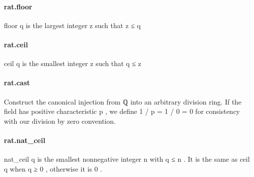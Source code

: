 \documentclass{article}
\begin{document}
\paragraph{rat.floor}
\par
\colorbox[RGB]{253,246,227}{{{{\color[RGB]{101, 123, 131} floor q }}}} is the largest integer 
\colorbox[RGB]{253,246,227}{{{{\color[RGB]{101, 123, 131} z }}}} such that 
\colorbox[RGB]{253,246,227}{{{{\color[RGB]{101, 123, 131} z  }}}{{{\color[RGB]{181, 137, 0} ≤ }}}{{{\color[RGB]{101, 123, 131}  q }}}}\paragraph{rat.ceil}
\par
\colorbox[RGB]{253,246,227}{{{{\color[RGB]{101, 123, 131} ceil q }}}} is the smallest integer 
\colorbox[RGB]{253,246,227}{{{{\color[RGB]{101, 123, 131} z }}}} such that 
\colorbox[RGB]{253,246,227}{{{{\color[RGB]{101, 123, 131} q  }}}{{{\color[RGB]{181, 137, 0} ≤ }}}{{{\color[RGB]{101, 123, 131}  z }}}}\paragraph{rat.cast}
\par
Construct the canonical injection from 
\colorbox[RGB]{253,246,227}{{{{\color[RGB]{101, 123, 131} ℚ }}}} into an arbitrary
division ring. If the field has positive characteristic 
\colorbox[RGB]{253,246,227}{{{{\color[RGB]{101, 123, 131} p }}}},
we define 
\colorbox[RGB]{253,246,227}{{{{\color[RGB]{108, 113, 196} 1 }}}{{{\color[RGB]{101, 123, 131}   }}}{{{\color[RGB]{181, 137, 0} / }}}{{{\color[RGB]{101, 123, 131}  p  }}}{{{\color[RGB]{181, 137, 0} = }}}{{{\color[RGB]{101, 123, 131}   }}}{{{\color[RGB]{108, 113, 196} 1 }}}{{{\color[RGB]{101, 123, 131}   }}}{{{\color[RGB]{181, 137, 0} / }}}{{{\color[RGB]{101, 123, 131}   }}}{{{\color[RGB]{108, 113, 196} 0 }}}{{{\color[RGB]{101, 123, 131}   }}}{{{\color[RGB]{181, 137, 0} = }}}{{{\color[RGB]{101, 123, 131}   }}}{{{\color[RGB]{108, 113, 196} 0 }}}} for consistency with our
division by zero convention.
\paragraph{rat.nat\_ceil}
\par
\colorbox[RGB]{253,246,227}{{{{\color[RGB]{101, 123, 131} nat\_ceil q }}}} is the smallest nonnegative integer 
\colorbox[RGB]{253,246,227}{{{{\color[RGB]{101, 123, 131} n }}}} with 
\colorbox[RGB]{253,246,227}{{{{\color[RGB]{101, 123, 131} q  }}}{{{\color[RGB]{181, 137, 0} ≤ }}}{{{\color[RGB]{101, 123, 131}  n }}}}.
It is the same as 
\colorbox[RGB]{253,246,227}{{{{\color[RGB]{101, 123, 131} ceil q }}}} when 
\colorbox[RGB]{253,246,227}{{{{\color[RGB]{101, 123, 131} q  }}}{{{\color[RGB]{181, 137, 0} ≥ }}}{{{\color[RGB]{101, 123, 131}   }}}{{{\color[RGB]{108, 113, 196} 0 }}}}, otherwise it is 
\colorbox[RGB]{253,246,227}{{{{\color[RGB]{108, 113, 196} 0 }}}}.
\end{document}
